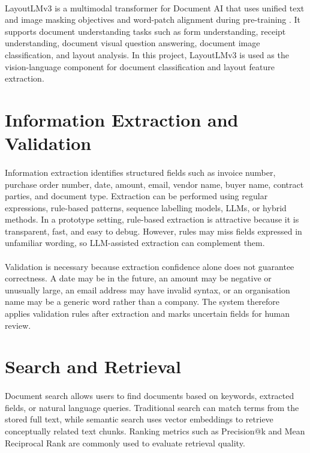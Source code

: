 \paragraph{} LayoutLMv3 is a multimodal transformer for Document AI that uses unified text and image masking objectives and word-patch alignment during pre-training \cite{huang2022layoutlmv3}. It supports document understanding tasks such as form understanding, receipt understanding, document visual question answering, document image classification, and layout analysis. In this project, LayoutLMv3 is used as the vision-language component for document classification and layout feature extraction.

\section{Information Extraction and Validation}
\paragraph{} Information extraction identifies structured fields such as invoice number, purchase order number, date, amount, email, vendor name, buyer name, contract parties, and document type. Extraction can be performed using regular expressions, rule-based patterns, sequence labelling models, LLMs, or hybrid methods. In a prototype setting, rule-based extraction is attractive because it is transparent, fast, and easy to debug. However, rules may miss fields expressed in unfamiliar wording, so LLM-assisted extraction can complement them.

\paragraph{} Validation is necessary because extraction confidence alone does not guarantee correctness. A date may be in the future, an amount may be negative or unusually large, an email address may have invalid syntax, or an organisation name may be a generic word rather than a company. The system therefore applies validation rules after extraction and marks uncertain fields for human review.

\section{Search and Retrieval}
\paragraph{} Document search allows users to find documents based on keywords, extracted fields, or natural language queries. Traditional search can match terms from the stored full text, while semantic search uses vector embeddings to retrieve conceptually related text chunks. Ranking metrics such as Precision@k and Mean Reciprocal Rank are commonly used to evaluate retrieval quality.

